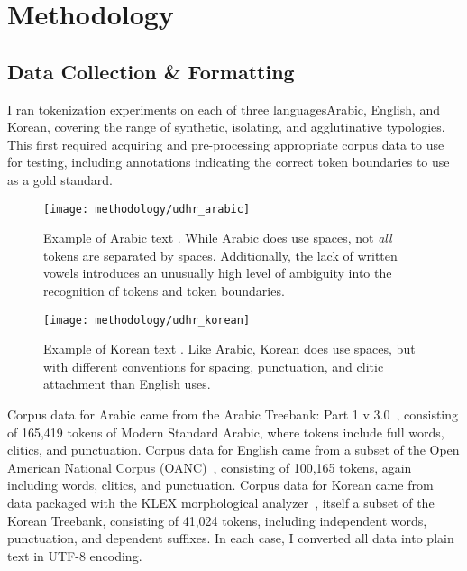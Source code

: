 \chapter{Methodology}


\section{Data Collection \& Formatting}
I ran tokenization experiments on each of three languages\textemdash Arabic, English, and Korean, covering the range of synthetic, isolating, and agglutinative typologies. This first required acquiring and pre-processing appropriate corpus data to use for testing, including annotations indicating the correct token boundaries to use as a gold standard.

\begin{figure}
	\begin{center}
		\texttt{[image: methodology/udhr\_arabic]}
		\caption[Example of Arabic Text]{Example of Arabic text \cite{omniara}. While Arabic does use spaces, not \textit{all} tokens are separated by spaces. Additionally, the lack of written vowels introduces an unusually high level of ambiguity into the recognition of tokens and token boundaries.}
		\label{aratext}
	\end{center}
\end{figure}

\begin{figure}
	\begin{center}
		\texttt{[image: methodology/udhr\_korean]}
		\caption[Example of Korean Text]{Example of Korean text \cite{omnikor}. Like Arabic, Korean does use spaces, but with different conventions for spacing, punctuation, and clitic attachment than English uses.}
		\label{kortext}
	\end{center}
\end{figure}

Corpus data for Arabic came from the Arabic Treebank: Part 1 v 3.0~\cite{maamouri05}, consisting of 165,419 tokens of Modern Standard Arabic, where tokens include full words, clitics, and punctuation. Corpus data for English came from a subset of the Open American National Corpus (OANC)~\cite{oanc}, consisting of 100,165 tokens, again including words, clitics, and punctuation. Corpus data for Korean came from data packaged with the KLEX morphological analyzer~\cite{han04}, itself a subset of the Korean Treebank, consisting of 41,024 tokens, including independent words, punctuation, and dependent suffixes. In each case, I converted all data into plain text in UTF-8 encoding.

